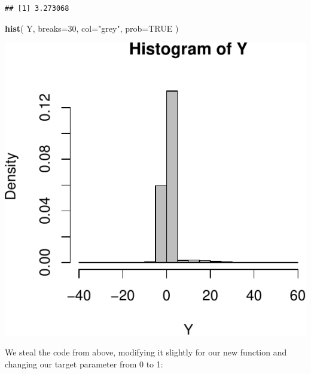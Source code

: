 \documentclass[
]{book}
\newenvironment{Shaded}{\begin{snugshade}}{\end{snugshade}}
\newcommand{\AttributeTok}[1]{\textcolor[rgb]{0.13,0.29,0.53}{#1}}
\newcommand{\ConstantTok}[1]{\textcolor[rgb]{0.56,0.35,0.01}{#1}}
\newcommand{\DecValTok}[1]{\textcolor[rgb]{0.00,0.00,0.81}{#1}}
\newcommand{\FunctionTok}[1]{\textcolor[rgb]{0.13,0.29,0.53}{\textbf{#1}}}
\newcommand{\NormalTok}[1]{#1}
\newcommand{\StringTok}[1]{\textcolor[rgb]{0.31,0.60,0.02}{#1}}
\begin{document}
\begin{verbatim}
## [1] 3.273068
\end{verbatim}

\begin{Shaded}
\begin{Highlighting}[]
\FunctionTok{hist}\NormalTok{( Y, }\AttributeTok{breaks=}\DecValTok{30}\NormalTok{, }\AttributeTok{col=}\StringTok{"grey"}\NormalTok{, }\AttributeTok{prob=}\ConstantTok{TRUE}\NormalTok{ )}
\end{Highlighting}
\end{Shaded}

\begin{center}\includegraphics[width=0.75\linewidth]{Designing-Simulations-in-R_files/figure-latex/unnamed-chunk-194-1} \end{center}

We steal the code from above, modifying it slightly for our new function and
changing our target parameter from 0 to 1:
\end{document}

